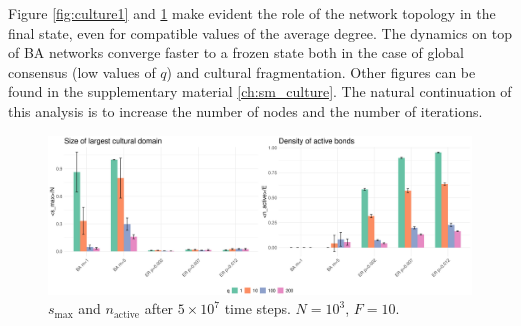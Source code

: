 \vspace{-0.1cm}
\noindent Figure \ref{fig:culture1} and \ref{fig:culture2} make evident the role of the network topology in the final state, even for compatible values of the average degree. The dynamics on top of BA networks converge faster to a frozen state both in the case of global consensus (low values of $q$) and cultural fragmentation. Other figures can be found in the supplementary material \ref{ch:sm_culture}. The natural continuation of this analysis is to increase the number of nodes and the number of iterations. 

\begin{figure}[h] 
    \centering
    \includegraphics[width=1\textwidth]{images/task30/culturalconvergence.png} 
    \vspace{-0.5cm}
    \caption{$s_\text{max}$ and $n_\text{active}$ after $5 \times 10^7$ time steps. $N=10^3$, $F=10$.}
    \label{fig:culture2} 
\end{figure}